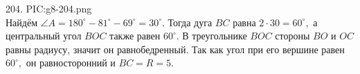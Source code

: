 204. {{PIC:g8-204.png}}\\
Найдём $\angle A=180^\circ-81^\circ-69^\circ=30^\circ.$ Тогда дуга $BC$ равна $2\cdot30=60^\circ,$ а центральный угол $BOC$ также равен $60^\circ.$ В треугольнике $BOC$ стороны $BO$ и $OC$ равны радиусу, значит он равнобедренный. Так как угол при его вершине равен $60^\circ,$ он равносторонний и $BC=R=5.$\\

